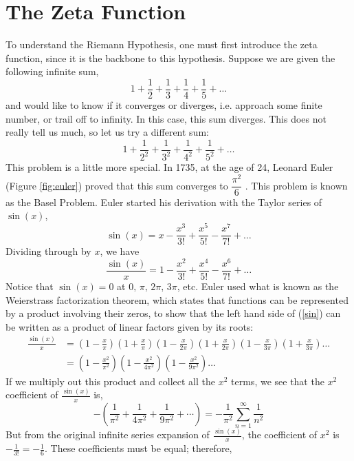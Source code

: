 \documentclass[12pt]{article}
\theoremstyle{plain}
\begin{document}
	\section{The Zeta Function}

	To understand the Riemann Hypothesis, one must first introduce the zeta function, since it is the backbone to this hypothesis. Suppose we are given the following infinite sum, 
	\[ 1 + \frac{1}{2} + \frac{1}{3} + \frac{1}{4} + \frac{1}{5} + \ldots \]
	and would like to know if it converges or diverges, i.e. approach some finite number, or trail off to infinity. In this case, this sum diverges. This does not really tell us much, so let us try a different sum:
	\[ 1 + \frac{1}{2^2} + \frac{1}{3^2} + \frac{1}{4^2} + \frac{1}{5^2} + \ldots \]
	This problem is a little more special. In 1735, at the age of 24, Leonard Euler (Figure \ref{fig:euler}) proved that this sum converges to $ \dfrac{\pi^2}{6} $ \cite{zeta(2)}. This problem is known as the Basel Problem. Euler started his derivation with the Taylor series of $ \sin(x) $,
	\[ \sin(x) = x - \frac{x^3}{3!} + \frac{x^5}{5!} - \frac{x^7}{7!} + \dots \]
	Dividing through by $ x $, we have
	\begin{equation}\label{sin}
		\frac{\sin(x)}{x} = 1 - \frac{x^2}{3!} + \frac{x^4}{5!} - \frac{x^6}{7!} + \dots
	\end{equation}
	Notice that $ \sin(x) = 0 $ at $ 0, \, \pi, \, 2\pi, \, 3\pi $, etc. Euler used what is known as the Weierstrass factorization theorem, which states that functions can be represented by a product involving their zeros, to show that the left hand side of (\ref{sin}) can be written as a product of linear factors given by its roots:
	\begin{align*}
		\frac{\sin(x)}{x} &= \left( 1 - \frac{x}{\pi} \right) \left( 1 + \frac{x}{\pi} \right) \left( 1 - \frac{x}{2\pi} \right) \left( 1 + \frac{x}{2\pi} \right) \left( 1 - \frac{x}{3\pi} \right) \left( 1 + \frac{x}{3\pi} \right) \dots\\
		&= \left( 1 - \frac{x^2}{\pi^2} \right) \left( 1 - \frac{x^2}{4\pi^2} \right) \left( 1 - \frac{x^2}{9\pi^2} \right) \dots
	\end{align*}
	If we multiply out this product and collect all the $ x^2 $ terms, we see that the $ x^2 $ coefficient of $ \frac{\sin(x)}{x} $ is,
	\[ - \left( \frac{1}{\pi^2} + \frac{1}{4\pi^2} + \frac{1}{9\pi^2} + \cdots \right) = -\frac{1}{\pi^2} \sum\limits_{n=1}^{\infty} \frac{1}{n^2} \]
	But from the original infinite series expansion of $ \frac{\sin(x)}{x} $, the coefficient of $ x^2 $ is $ -\frac{1}{3!} = -\frac{1}{6} $. These coefficients must be equal; therefore,
\end{document}
